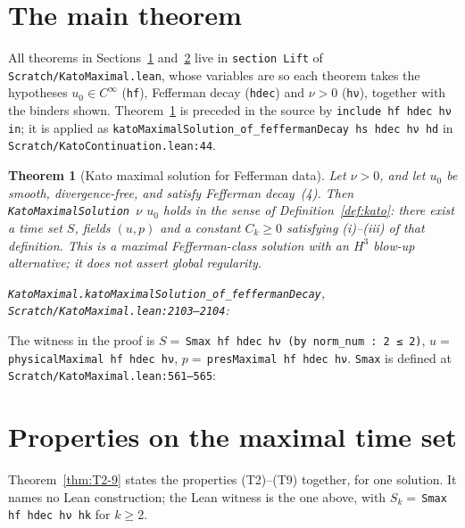 \documentclass[11pt]{article}
\newcommand{\lean}[1]{\texttt{#1}}
\newtheorem{theorem}{Theorem}
\theoremstyle{definition}
\theoremstyle{remark}
\begin{document}
\section{The main theorem}
\label{sec:main}
All theorems in Sections~\ref{sec:main} and~\ref{sec:smax} live in \lean{section Lift} of \lean{Scratch/KatoMaximal.lean}, whose variables are
so each theorem takes the hypotheses $u_0\in C^\infty$ (\lean{hf}), Fefferman decay (\lean{hdec}) and $\nu>0$ (\lean{hν}), together with the binders shown. Theorem~\ref{thm:T1} is preceded in the source by \lean{include hf hdec hν in}; it is applied as \lean{katoMaximalSolution\_of\_feffermanDecay hs hdec hν hd} in \lean{Scratch/KatoContinuation.lean:44}.

\begin{theorem}[Kato maximal solution for Fefferman data]
\label{thm:T1}
Let $\nu>0$, and let $u_0$ be smooth, divergence-free, and satisfy Fefferman decay~(4). Then \lean{KatoMaximalSolution}\ $\nu$ $u_0$ holds in the sense of Definition~\ref{def:kato}: there exist a time set $S$, fields $(u,p)$ and a constant $C_k\ge 0$ satisfying (i)--(iii) of that definition. This is a maximal Fefferman-class solution with an $H^3$ blow-up alternative; it does not assert global regularity.

\noindent\lean{KatoMaximal.katoMaximalSolution\_of\_feffermanDecay}, \lean{Scratch/KatoMaximal.lean:2103--2104}:
\end{theorem}

The witness in the proof is $S=$\,\lean{Smax hf hdec hν (by norm\_num : 2 ≤ 2)}, $u=$\,\lean{physicalMaximal hf hdec hν}, $p=$\,\lean{presMaximal hf hdec hν}. \lean{Smax} is defined at \lean{Scratch/KatoMaximal.lean:561--565}:

\section{Properties on the maximal time set}
\label{sec:smax}
Theorem~\ref{thm:T2-9} states the properties (T2)--(T9) together, for one solution. It names no Lean construction; the Lean witness is the one above, with $S_k=$\,\lean{Smax hf hdec hν hk} for $k\ge 2$.
\end{document}
